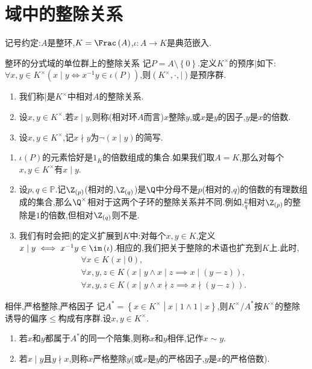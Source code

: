 \section{域中的整除关系}

记号约定:$A$是整环,$K=\Frac\left(A\right)$,$\iota:A\to K$是典范嵌入.

\begin{definition}{整环的分式域的单位群上的整除关系}{}
	记$P=A\setminus\left\{0\right\}$.定义$K^{\times}$的预序$\mid$如下:$\forall x,y\in K^{\times}\left(x\mid y\iff x^{-1}y\in\iota\left(P\right)\right)$,则$\left(K^{\times},\cdot,\mid\right)$是预序群.
	\begin{enumerate}
		\item 我们称$\mid$是$K^{\times}$中相对$A$的整除关系.
		\item 设$x,y\in K^{\times}$.若$x\mid y$,则称(相对环$A$而言)$x$整除$y$,或$x$是$y$的因子,$y$是$x$的倍数.
		\item 设$x,y\in K^{\times}$,记$x\nmid y$为$\neg\left(x\mid y\right)$的简写.
	\end{enumerate}
\end{definition}

\begin{remark}{}{}
	\begin{enumerate}
		\item $\iota\left(P\right)$的元素恰好是$1_{K}$的倍数组成的集合.如果我们取$A=K$,那么对每个$x,y\in K^{\times}$有$x\mid y$.
		\item 设$p,q\in\mathbb{P}$.记$\Z_{\left(p\right)}$(相对的,$\Z_{\left(q\right)}$)是$\Q$中分母不是$p$(相对的,$q$)的倍数的有理数组成的集合,那么$\Q^{\times}$相对于这两个子环的整除关系并不同.例如,$\frac{p}{q}$相对$\Z_{\left(p\right)}$的整除是$1$的倍数,但相对$\Z_{\left(q\right)}$则不是.
		\item 我们有时会把$\mid$的定义扩展到$K$中:对每个$x,y\in K$,定义$x\mid y\iff x^{-1}y\in\im\left(\iota\right)$.相应的,我们把关于整除的术语也扩充到$K$上.此时,
		\begin{gather*}
			\forall x\in K\left(x\mid 0\right),\\
			\forall x,y,z\in K\left(x\mid y\wedge x\mid z\implies x\mid\left(y-z\right)\right),\\
			\forall x,y,z\in K\left(x\mid y\wedge x\nmid z\implies x\nmid\left(y-z\right)\right).
		\end{gather*}
	\end{enumerate}
\end{remark}

\begin{definition}{相伴,严格整除,严格因子}{}
	记$A^{\ast}=\left\{x\in K^{\times}\middle|x\mid 1\wedge 1\mid x\right\}$,则$K^{\times}/A^{\ast}$按$K^{\times}$的整除诱导的偏序$\leq$构成有序群.设$x,y\in K^{\times}$.
	\begin{enumerate}
		\item 若$x$和$y$都属于$A^{\ast}$的同一个陪集,则称$x$和$y$相伴,记作$x\sim y$.
		\item 若$x\mid y$且$y\nmid x$,则称$x$严格整除$y$(或$x$是$y$的严格因子,$y$是$x$的严格倍数).
	\end{enumerate}
\end{definition}

